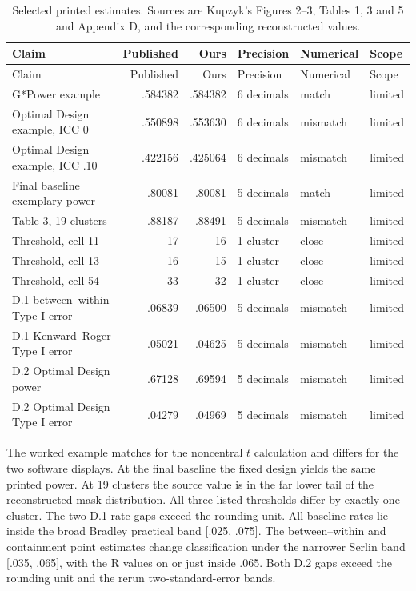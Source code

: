 \begin{longtable}{@{}L{.27\linewidth}rrL{.14\linewidth}ll@{}}
\caption{Selected printed estimates. Sources are Kupzyk's Figures 2--3, Tables 1, 3 and 5 and Appendix D, and the corresponding reconstructed values.}\\
\toprule
Claim & Published & Ours & Precision & Numerical & Scope \\
\midrule\endfirsthead
\toprule
Claim & Published & Ours & Precision & Numerical & Scope \\
\midrule\endhead
G*Power example & .584382 & .584382 & 6 decimals & match & limited \\
Optimal Design example, ICC 0 & .550898 & .553630 & 6 decimals & mismatch & limited \\
Optimal Design example, ICC .10 & .422156 & .425064 & 6 decimals & mismatch & limited \\
Final baseline exemplary power & .80081 & .80081 & 5 decimals & match & limited \\
Table 3, 19 clusters & .88187 & .88491 & 5 decimals & mismatch & limited \\
Threshold, cell 11 & 17 & 16 & 1 cluster & close & limited \\
Threshold, cell 13 & 16 & 15 & 1 cluster & close & limited \\
Threshold, cell 54 & 33 & 32 & 1 cluster & close & limited \\
D.1 between--within Type I error & .06839 & .06500 & 5 decimals & mismatch & limited \\
D.1 Kenward--Roger Type I error & .05021 & .04625 & 5 decimals & mismatch & limited \\
D.2 Optimal Design power & .67128 & .69594 & 5 decimals & mismatch & limited \\
D.2 Optimal Design Type I error & .04279 & .04969 & 5 decimals & mismatch & limited \\
\bottomrule
\end{longtable}

The worked example matches for the noncentral $t$ calculation and differs for the two software displays. At the final baseline the fixed design yields the same printed power. At 19 clusters the source value is in the far lower tail of the reconstructed mask distribution. All three listed thresholds differ by exactly one cluster. The two D.1 rate gaps exceed the rounding unit. All baseline rates lie inside the broad Bradley practical band [.025, .075]. The between--within and containment point estimates change classification under the narrower Serlin band [.035, .065], with the R values on or just inside .065. Both D.2 gaps exceed the rounding unit and the rerun two-standard-error bands.

